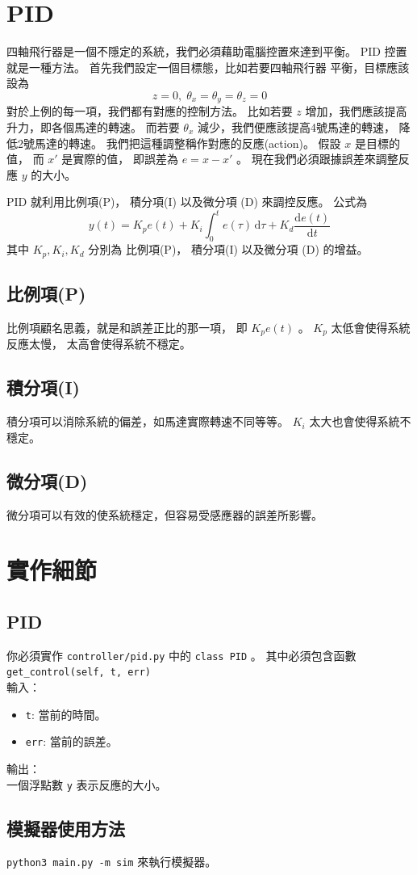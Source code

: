 \documentclass[12pt, a4paper]{article}
\newcommand{\dD}{\mathrm{d}}
\newcommand{\dI}{\,\mathrm{d}}
\begin{document}
\section{PID}
四軸飛行器是一個不隱定的系統，我們必須藉助電腦控置來達到平衡。
PID 控置就是一種方法。 首先我們設定一個目標態，比如若要四軸飛行器
平衡，目標應該設為
\[ z = 0, \; \theta_x = \theta_y = \theta_z = 0 \]
對於上例的每一項，我們都有對應的控制方法。
比如若要 $z$ 增加，我們應該提高升力，即各個馬達的轉速。
而若要 $\theta_x$ 減少，我們便應該提高4號馬達的轉速，
降低2號馬達的轉速。 我們把這種調整稱作對應的反應(action)。
假設 $x$ 是目標的值， 而 $x'$ 是實際的值， 即誤差為
$e = x - x'$ 。 現在我們必須跟據誤差來調整反應
$y$ 的大小。

PID 就利用比例項(P)， 積分項(I) 以及微分項 (D) 來調控反應。
公式為
\[ y(t) = K_p e(t) + K_i \int_{0}^{t} e(\tau) \dI \tau + K_d \frac{\dD e(t)}{\dD t}\]
其中 $K_p, K_i, K_d$ 分別為 比例項(P)， 積分項(I) 以及微分項 (D) 的增益。
\subsection{比例項(P)}
比例項顧名思義，就是和誤差正比的那一項， 即 $K_p e(t)$ 。
$K_p$ 太低會使得系統反應太慢， 太高會使得系統不穩定。
\subsection{積分項(I)}
積分項可以消除系統的偏差，如馬達實際轉速不同等等。
$K_i$ 太大也會使得系統不穩定。
\subsection{微分項(D)}
微分項可以有效的使系統穩定，但容易受感應器的誤差所影響。

\section{實作細節}
\subsection{PID}
你必須實作 \texttt{controller/pid.py} 中的 \texttt{class PID} 。 
其中必須包含函數 \\
\texttt{get\_control(self, t, err)} \\
輸入：
\begin{itemize}
  \item \texttt{t}: 當前的時間。
  \item \texttt{err}: 當前的誤差。
\end{itemize}
輸出： \\
一個浮點數 \texttt{y} 表示反應的大小。

\subsection{模擬器使用方法}
\texttt{python3 main.py -m sim} 來執行模擬器。
 
\end{document}
